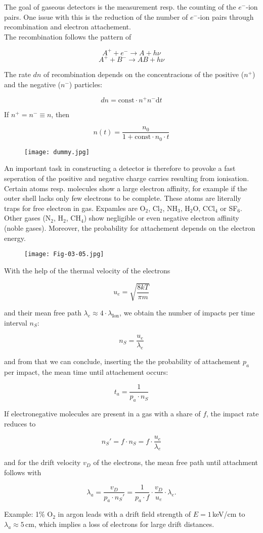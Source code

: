 The goal of gaseous detectors is the measurement resp. the counting of the $e^-$-ion pairs. One
issue with this is the reduction of the number of $e^-$-ion pairs through recombination and electron
attachement.
\\
The recombination follows the pattern of

\[A^+ + e^- \longrightarrow A + h\nu \]
\[A^+ + B^- \longrightarrow AB + h\nu  \]

The rate $dn$ of recombination depends on the concentracions of the positive ($n^+$) and the
negative ($n^-$) particles:

\[dn= \text{const}\cdot n^+ n^- \mathrm{d}t \]

If $n^+=n^-\equiv n$, then

\[n(t) = \frac{n_0}{1+\text{const}\cdot n_0\cdot t}  \]

\begin{figure}[H]
	\centering
	\texttt{[image: dummy.jpg]}
\end{figure}

An important task in constructing a detector is therefore to provoke a fast seperation of the
positive and negative charge carries resulting from ionisation.
\\
Certain atoms resp. molecules show a large electron affinity, for example if the outer shell lacks
only few electrons to be complete. These atoms are literally traps for free electron in gas.
Expamles are O$_2$, Cl$_2$, NH$_3$, H$_2$O, CCl$_4$ or SF$_6$.
\\
Other gases (N$_2$, H$_2$, CH$_4$) show negligible or even negative electron affinity (noble gases).
Moreover, the probability for attachement depends on the electron energy.

\begin{figure}[H]
	\centering
	\texttt{[image: Fig-03-05.jpg]}
\end{figure}

With the help of the thermal velocity of the electrons 

\[u_e = \sqrt{\frac{8kT}{\pi m}}  \]

and their mean free path $\lambda_e \approx 4\cdot \lambda_{\text{Ion}}$, we obtain the number of
impacts per time interval $n_S$:

\[ n_S = \frac{u_e}{\lambda_e}  \]

and from that we can conclude, inserting the the probability of attachement $p_a$ per impact, the
mean time until attachement occurs:

\[t_a=\frac{1}{p_a\cdot n_S}  \]

If electronegative molecules are present in a gas with a share of $f$, the impact rate reduces to 

\[n_S' = f\cdot n_S = f\cdot \frac{u_e}{\lambda_e} \]

and for the drift velocity $v_D$ of the electrons, the mean free path until attachment follows with 

\[\lambda_a = \frac{v_D}{p_a\cdot n_S'}=\frac{1}{p_a\cdot f}\cdot \frac{v_D}{u_e}\cdot \lambda_e  
.\]

Example: 1\% O$_2$ in argon leads with a drift field strength of $E=1\,$keV/cm to
$\lambda_a\approx5\,$cm, which implies a loss of electrons for large drift distances.
